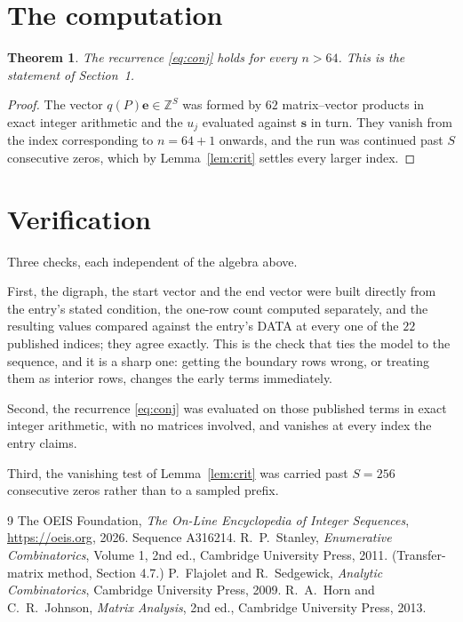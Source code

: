 \documentclass[11pt,a4paper]{article}
\theoremstyle{plain}
\newtheorem{theorem}{Theorem}
\theoremstyle{definition}
\begin{document}
\section{The computation}

\begin{theorem}
The recurrence \eqref{eq:conj} holds for every $n>64$. This is the statement of
Section~1.
\end{theorem}

\begin{proof}
The vector $q(P)\mathbf{e}\in\mathbb{Z}^{S}$ was formed by $62$ matrix--vector
products in exact integer arithmetic and the $u_j$ evaluated against $\mathbf{s}$ in turn.
They vanish from the index corresponding to $n=64+1$ onwards, and the run was continued
past $S$ consecutive zeros, which by Lemma~\ref{lem:crit} settles every larger index.
\end{proof}

\section{Verification}

Three checks, each independent of the algebra above.

First, the digraph, the start vector and the end vector were built directly from the
entry's stated condition, the one-row count computed separately, and the resulting values
compared against the entry's DATA at every one of the $22$ published indices; they
agree exactly. This is the check that ties the model to the sequence, and it is a sharp one:
getting the boundary rows wrong, or treating them as interior rows, changes the early terms
immediately.

Second, the recurrence \eqref{eq:conj} was evaluated on those published terms in exact
integer arithmetic, with no matrices involved, and vanishes at every index the entry claims.

Third, the vanishing test of Lemma~\ref{lem:crit} was carried past $S=256$ consecutive
zeros rather than to a sampled prefix.

\begin{thebibliography}{9}
 The OEIS Foundation, \emph{The On-Line Encyclopedia of Integer
Sequences}, \url{https://oeis.org}, 2026. Sequence A316214.
 R.~P.~Stanley, \emph{Enumerative Combinatorics}, Volume 1, 2nd ed.,
Cambridge University Press, 2011. (Transfer-matrix method, Section 4.7.)
 P.~Flajolet and R.~Sedgewick, \emph{Analytic Combinatorics}, Cambridge
University Press, 2009.
 R.~A.~Horn and C.~R.~Johnson, \emph{Matrix Analysis}, 2nd ed., Cambridge
University Press, 2013.
\end{thebibliography}
\end{document}
